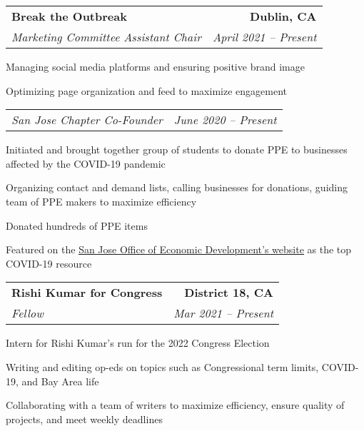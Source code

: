 \documentclass{article}
\newlength{\secskip}
\begin{document}
\goodbreak\vspace{\secskip}\par\noindent\begin{tabularx}{\linewidth}{Xr}
    \textbf{Break the Outbreak} & \textbf{Dublin, CA}\\
    \textit{Marketing Committee Assistant Chair} & \textit{April 2021 -- Present}\\
\end{tabularx}
\begin{compactitem}
    \item Managing social media platforms and ensuring positive brand image
    \item Optimizing page organization and feed to maximize engagement
\end{compactitem}
\goodbreak\vspace{\secskip}\par\noindent\begin{tabularx}{\linewidth}{Xr}
    \textit{San Jose Chapter Co-Founder} & \textit{June 2020 -- Present}\\
\end{tabularx}
\begin{compactitem}
    \item Initiated and brought together group of students to donate PPE to businesses affected by the COVID-19 pandemic
    \item Organizing contact and demand lists, calling businesses for donations, guiding team of PPE makers to maximize efficiency
    \item Donated hundreds of PPE items
    \item Featured on the \href{https://www.sjeconomy.com/why-san-jose/covid-19-guidance/local-suppliers}{\underline{San Jose Office of Economic Development's website}} as the top COVID-19 resource
\end{compactitem}

\goodbreak\vspace{\secskip}\par\noindent\begin{tabularx}{\linewidth}{Xr}
    \textbf{Rishi Kumar for Congress} & \textbf{District 18, CA}\\
    \textit{Fellow} & \textit{Mar 2021 -- Present}\\
\end{tabularx}
\begin{compactitem}
    \item Intern for Rishi Kumar's run for the 2022 Congress Election
    \item Writing and editing op-eds on topics such as Congressional term limits, COVID-19, and Bay Area life
    \item Collaborating with a team of writers to maximize efficiency, ensure quality of projects, and meet weekly deadlines
\end{compactitem}
\end{document}
